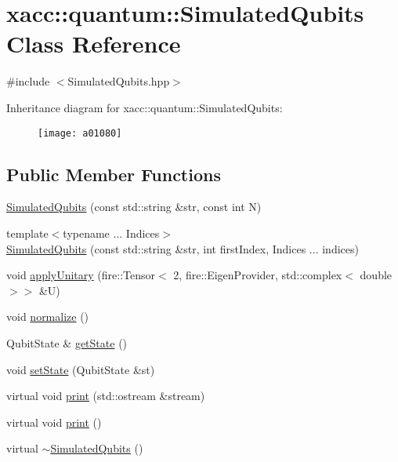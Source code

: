 \hypertarget{a01080}{}\section{xacc\+:\+:quantum\+:\+:Simulated\+Qubits Class Reference}
\label{a01080}


{\ttfamily \#include $<$Simulated\+Qubits.\+hpp$>$}

Inheritance diagram for xacc\+:\+:quantum\+:\+:Simulated\+Qubits\+:\begin{figure}[H]
\begin{center}
\leavevmode
\texttt{[image: a01080]}
\end{center}
\end{figure}
\subsection*{Public Member Functions}
\begin{DoxyCompactItemize}
\item 
\hyperlink{a01080_abb0419229628210a1c187b76be6edc30}{Simulated\+Qubits} (const std\+::string \&str, const int N)
\item 
{\footnotesize template$<$typename ... Indices$>$ }\\\hyperlink{a01080_a812afe5bad306acfe2b46e05098040a4}{Simulated\+Qubits} (const std\+::string \&str, int first\+Index, Indices ... indices)
\item 
void \hyperlink{a01080_a3f4518d0135101141bf92d7e31f4fddc}{apply\+Unitary} (fire\+::\+Tensor$<$ 2, fire\+::\+Eigen\+Provider, std\+::complex$<$ double $>$$>$ \&U)
\item 
void \hyperlink{a01080_a09ee499769bb1eedaf08d6b5c29f9791}{normalize} ()
\item 
Qubit\+State \& \hyperlink{a01080_a405577717ca200ed9e524c04209e0216}{get\+State} ()
\item 
void \hyperlink{a01080_a8cd74c239c1fcecb3d03d6989732d5fe}{set\+State} (Qubit\+State \&st)
\item 
virtual void \hyperlink{a01080_a9252d30be0563f36bf1ff839c7104cd7}{print} (std\+::ostream \&stream)
\item 
virtual void \hyperlink{a01080_a32922bd2ccc64bba601c07a3c136cc3d}{print} ()
\item 
virtual \hyperlink{a01080_aebf6f30a6d8c84971091d87908680e7e}{$\sim$\+Simulated\+Qubits} ()
\end{DoxyCompactItemize}
